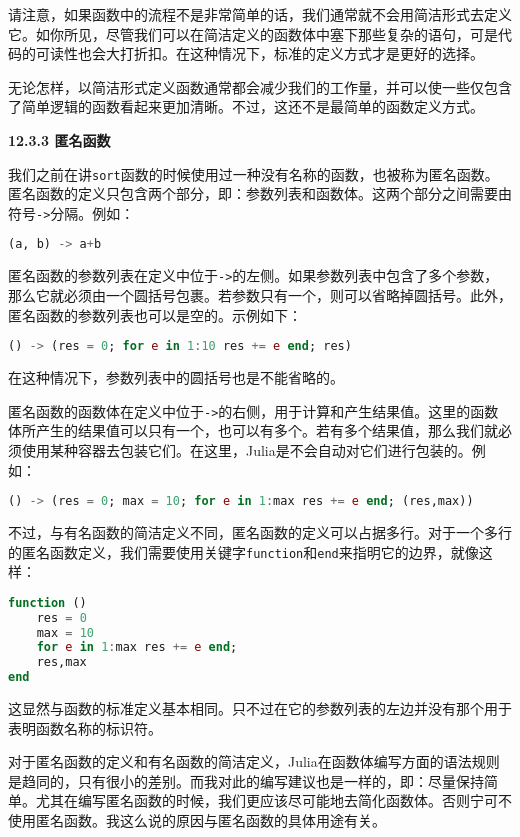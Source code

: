 请注意，如果函数中的流程不是非常简单的话，我们通常就不会用简洁形式去定义它。如你所见，尽管我们可以在简洁定义的函数体中塞下那些复杂的语句，可是代码的可读性也会大打折扣。在这种情况下，标准的定义方式才是更好的选择。

无论怎样，以简洁形式定义函数通常都会减少我们的工作量，并可以使一些仅包含了简单逻辑的函数看起来更加清晰。不过，这还不是最简单的函数定义方式。

\textbf{12.3.3 匿名函数}

我们之前在讲\verb`sort`函数的时候使用过一种没有名称的函数，也被称为匿名函数。匿名函数的定义只包含两个部分，即：参数列表和函数体。这两个部分之间需要由符号\verb`->`分隔。例如：

\begin{lstlisting}[language=julia]
(a, b) -> a+b
\end{lstlisting}

匿名函数的参数列表在定义中位于\verb`->`的左侧。如果参数列表中包含了多个参数，那么它就必须由一个圆括号包裹。若参数只有一个，则可以省略掉圆括号。此外，匿名函数的参数列表也可以是空的。示例如下：

\begin{lstlisting}[language=julia]
() -> (res = 0; for e in 1:10 res += e end; res)
\end{lstlisting}

在这种情况下，参数列表中的圆括号也是不能省略的。

匿名函数的函数体在定义中位于\verb`->`的右侧，用于计算和产生结果值。这里的函数体所产生的结果值可以只有一个，也可以有多个。若有多个结果值，那么我们就必须使用某种容器去包装它们。在这里，Julia是不会自动对它们进行包装的。例如：

\begin{lstlisting}[language=julia]
() -> (res = 0; max = 10; for e in 1:max res += e end; (res,max))
\end{lstlisting}

不过，与有名函数的简洁定义不同，匿名函数的定义可以占据多行。对于一个多行的匿名函数定义，我们需要使用关键字\verb`function`和\verb`end`来指明它的边界，就像这样：

\begin{lstlisting}[language=julia]
function ()
    res = 0
    max = 10
    for e in 1:max res += e end;
    res,max
end
\end{lstlisting}

这显然与函数的标准定义基本相同。只不过在它的参数列表的左边并没有那个用于表明函数名称的标识符。

对于匿名函数的定义和有名函数的简洁定义，Julia在函数体编写方面的语法规则是趋同的，只有很小的差别。而我对此的编写建议也是一样的，即：尽量保持简单。尤其在编写匿名函数的时候，我们更应该尽可能地去简化函数体。否则宁可不使用匿名函数。我这么说的原因与匿名函数的具体用途有关。


